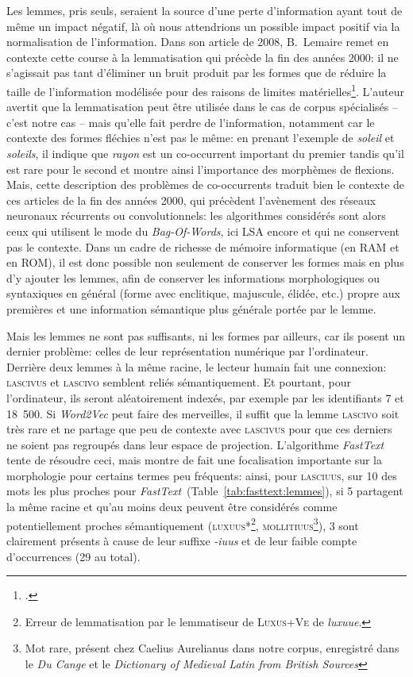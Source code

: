 Les lemmes, pris seuls, seraient la source d'une perte d'information ayant tout de même un impact négatif, là où nous attendrions un possible impact positif via la normalisation de l'information. Dans son article de 2008, B.~Lemaire remet en contexte cette course à la lemmatisation qui précède la fin des années 2000: il ne s'agissait pas tant d'éliminer un bruit produit par les formes que de réduire la taille de l'information modélisée pour des raisons de limites matérielles\footcite[p. 1]{lemaire_limites_2008}. L'auteur avertit que la lemmatisation peut être utilisée dans le cas de corpus spécialisés -- c'est notre cas -- mais qu'elle fait perdre de l'information, notamment car le contexte des formes fléchies n'est pas le même: en prenant l'exemple de \textit{soleil} et \textit{soleils}, il indique que \textit{rayon} est un co-occurrent important du premier tandis qu'il est rare pour le second et montre ainsi l'importance des morphèmes de flexions. Mais, cette description des problèmes de co-occurrents traduit bien le contexte de ces articles de la fin des années 2000, qui précèdent l'avènement des réseaux neuronaux récurrents ou convolutionnels: les algorithmes considérés sont alors ceux qui utilisent le mode du \textit{Bag-Of-Words}, ici LSA encore et qui ne conservent pas le contexte. Dans un cadre de richesse de mémoire informatique (en RAM et en ROM), il est donc possible non seulement de conserver les formes mais en plus d'y ajouter les lemmes, afin de conserver les informations morphologiques ou syntaxiques en général (forme avec enclitique, majuscule, élidée, etc.) propre aux premières et une information sémantique plus générale portée par le lemme.

Mais les lemmes ne sont pas suffisants, ni les formes par ailleurs, car ils posent un dernier problème: celles de leur représentation numérique par l'ordinateur. Derrière deux lemmes à la même racine, le lecteur humain fait une connexion: \textsc{lascivus} et \textsc{lascivo} semblent reliés sémantiquement. Et pourtant, pour l'ordinateur, ils seront aléatoirement indexés, par exemple par les identifiants 7 et 18~500. Si \textit{Word2Vec} peut faire des merveilles, il suffit que la lemme \textsc{lascivo} soit très rare et ne partage que peu de contexte avec \textsc{lascivus} pour que ces derniers ne soient pas regroupés dans leur espace de projection. L'algorithme \textit{FastText} tente de résoudre ceci, mais montre de fait une focalisation importante sur la morphologie pour certains termes peu fréquents: ainsi, pour \textsc{lasciuus}, sur 10 des mots les plus proches pour \textit{FastText}~(Table~\ref{tab:fasttext:lemmes}), si 5 partagent la même racine et qu'au moins deux peuvent être considérés comme potentiellement proches sémantiquement (\textsc{luxuus*\footnote{Erreur de lemmatisation par le lemmatiseur de \textsc{Luxus+Ve} de \textit{luxuue}.}, mollitiuus}\footnote{Mot rare, présent chez Caelius Aurelianus dans notre corpus, enregistré dans le \textit{Du Cange} et le \textit{Dictionary of Medieval Latin from British Sources}}), 3 sont clairement présents à cause de leur suffixe \textit{-iuus} et de leur faible compte d'occurrences (29 au total).


